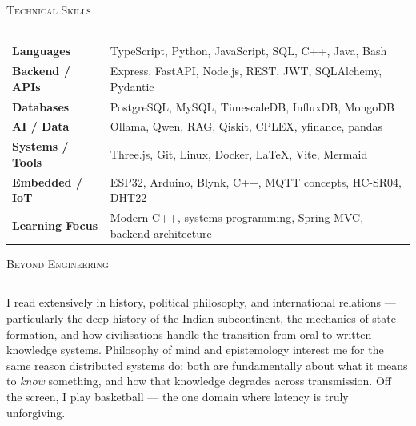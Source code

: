 \documentclass[10pt, a4paper]{article}
\newcommand{\rsection}[1]{%
  \vspace{7pt}%
  {\small\scshape\color{muted}#1}%
  \vspace{2pt}\par\noindent%
  {\color{ruled}\rule{\linewidth}{0.4pt}}\par%
  \vspace{2pt}%
}
\begin{document}
\rsection{Technical Skills}

\noindent
\begin{tabular}{@{}p{3.2cm} p{\dimexpr\linewidth-3.2cm}@{}}
  \textbf{Languages}       & TypeScript, Python, JavaScript, SQL, C++, Java, Bash \\[4pt]
  \textbf{Backend / APIs}  & Express, FastAPI, Node.js, REST, JWT, SQLAlchemy, Pydantic  \\[4pt]
  \textbf{Databases}       & PostgreSQL, MySQL, TimescaleDB, InfluxDB, MongoDB     \\[4pt]
  \textbf{AI / Data}       & Ollama, Qwen, RAG, Qiskit, CPLEX, yfinance, pandas   \\[4pt]
  \textbf{Systems / Tools} & Three.js, Git, Linux, Docker, \LaTeX{}, Vite, Mermaid \\[4pt]
  \textbf{Embedded / IoT}  & ESP32, Arduino, Blynk, C++, MQTT concepts, HC-SR04, DHT22 \\[4pt]
  \textbf{Learning Focus}  & Modern C++, systems programming, Spring MVC, backend architecture
\end{tabular}

\rsection{Beyond Engineering}

{\small\color{mid}
I read extensively in history, political philosophy, and international relations ---
particularly the deep history of the Indian subcontinent, the mechanics of state formation,
and how civilisations handle the transition from oral to written knowledge systems.
Philosophy of mind and epistemology interest me for the same reason
distributed systems do: both are fundamentally about what it means to \textit{know} something,
and how that knowledge degrades across transmission.
Off the screen, I play basketball --- the one domain where latency is truly unforgiving.
}
\end{document}
